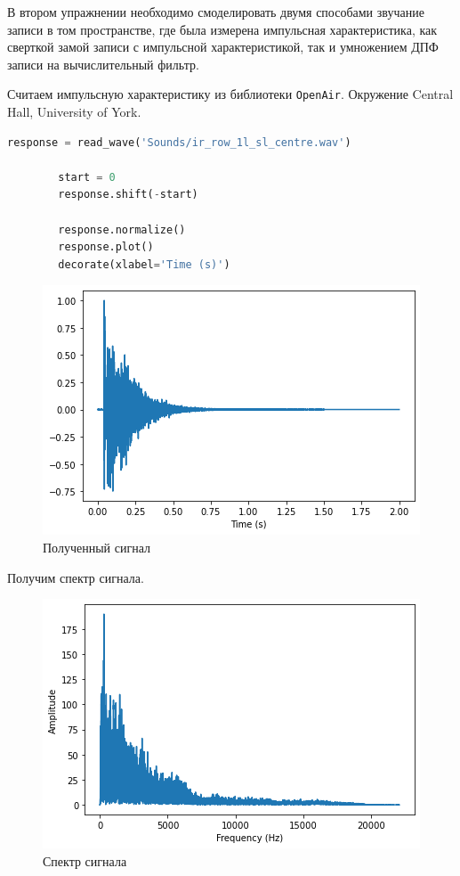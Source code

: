 \documentclass[a4paper, 14pt]{extarticle}
\begin{document}
    В втором упражнении необходимо смоделировать двумя способами звучание записи в том пространстве, где была измерена импульсная характеристика, как сверткой замой записи с импульсной характеристикой, так и умножением ДПФ записи на вычислительный фильтр.

    Считаем импульсную характеристику из библиотеки \texttt{OpenAir}.
    Окружение Central Hall, University of York.

    \begin{lstlisting}[language=Python, caption= Считывание импульсной характеристики, label={lst:read_ir}]
        response = read_wave('Sounds/ir_row_1l_sl_centre.wav')

        start = 0
        response.shift(-start)

        response.normalize()
        response.plot()
        decorate(xlabel='Time (s)')
    \end{lstlisting}

    \begin{figure}[H]
        \centering
        \includegraphics[width=0.8\linewidth]{ir_wave}
        \caption{Полученный сигнал}
        \label{fig:ir_wave}
    \end{figure}

    Получим спектр сигнала.

    \begin{figure}[H]
        \centering
        \includegraphics[width=0.8\linewidth]{ir_spectrum}
        \caption{Спектр сигнала}
        \label{fig:ir_spectrum}
    \end{figure}
\end{document}
